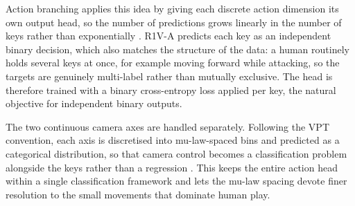 Action branching applies this idea by giving each discrete action dimension
its own output head, so the number of predictions grows linearly in the
number of keys rather than exponentially \cite{tavakoli2018actionbranching}.
R1V-A predicts each key as an independent binary decision, which also matches
the structure of the data: a human routinely holds several keys at once, for
example moving forward while attacking, so the targets are genuinely
multi-label rather than mutually exclusive. The head is therefore trained
with a binary cross-entropy loss applied per key, the natural objective for
independent binary outputs.

The two continuous camera axes are handled separately. Following the VPT
convention, each axis is discretised into mu-law-spaced bins and predicted as
a categorical distribution, so that camera control becomes a classification
problem alongside the keys rather than a regression
\cite{baker2022vpt}. This keeps the entire action head within a single
classification framework and lets the mu-law spacing devote finer resolution
to the small movements that dominate human play.


